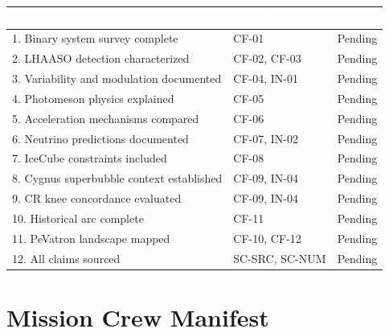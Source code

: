 \documentclass[11pt,letterpaper]{article}
\newcommand{\tableheader}[1]{\textbf{\sffamily\textcolor{white}{#1}}}
\begin{document}
\begin{center}
\begin{tabularx}{\textwidth}{XL{3.5cm}C{2cm}}
\toprule
{}
\tableheader{Success Criterion} & \tableheader{Test ID(s)} & \tableheader{Status} \\
. Binary system survey complete & CF-01 & Pending \\
2. LHAASO detection characterized & CF-02, CF-03 & Pending \\
3. Variability and modulation documented & CF-04, IN-01 & Pending \\
4. Photomeson physics explained & CF-05 & Pending \\
5. Acceleration mechanisms compared & CF-06 & Pending \\
6. Neutrino predictions documented & CF-07, IN-02 & Pending \\
7. IceCube constraints included & CF-08 & Pending \\
8. Cygnus superbubble context established & CF-09, IN-04 & Pending \\
9. CR knee concordance evaluated & CF-09, IN-04 & Pending \\
10. Historical arc complete & CF-11 & Pending \\
11. PeVatron landscape mapped & CF-10, CF-12 & Pending \\
12. All claims sourced & SC-SRC, SC-NUM & Pending \\
\bottomrule
\end{tabularx}
\end{center}

\section{Mission Crew Manifest}
\end{document}
